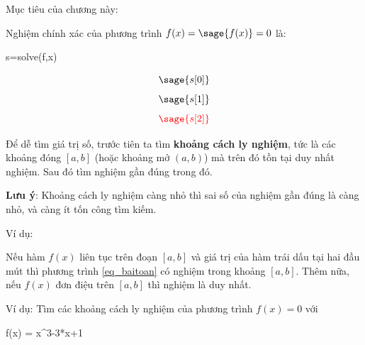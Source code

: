 \documentclass[12pt]{article}
\begin{document}
Mục tiêu của chương này:


\newpage{}

Nghiệm chính xác của phương trình $f(x)=\sage{f(x)}=0$ là:
\begin{sagesilent}
s=solve(f,x)
\end{sagesilent}
\[
\sage{s[0]}
\]
\[
\sage{s[1]}
\]
\[
\red{\sage{s[2]}}
\]


Để dễ tìm giá trị số, trước tiên ta tìm \textbf{khoảng cách ly nghiệm}, tức là các khoảng đóng $[a,b]$ (hoặc khoảng mở $(a,b)$) mà trên đó tồn tại duy nhất nghiệm. Sau đó tìm nghiệm gần đúng trong đó.

\textbf{Lưu ý}: Khoảng cách ly nghiệm càng nhỏ thì sai số của nghiệm gần đúng là càng nhỏ, và càng ít tốn công tìm kiếm.

\newpage{}

Ví dụ:




\newpage{}

\begin{Thm}\label{thm_hamtraidau}
 Nếu hàm $f(x)$ liên tục trên đoạn $[a,b]$ và giá trị của hàm trái dấu tại hai đầu mút thì phương trình \eqref{eq_baitoan} có nghiệm trong khoảng $[a,b]$. Thêm nữa, nếu $f(x)$ đơn điệu trên $[a,b]$ thì nghiệm là duy nhất.
\end{Thm}

Ví dụ: Tìm các khoảng cách ly nghiệm của phương trình $f(x)=0$ với
 \begin{sagesilent}
  f(x) = x^3-3*x+1
 \end{sagesilent}
\end{document}
